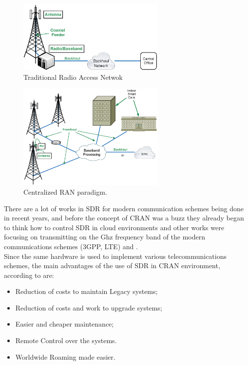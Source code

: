 \begin{figure}[htbp]
    \centering
    \includegraphics[width=0.65\textwidth]{./figures/traditional_bs}
    \caption{ Traditional Radio Access Netwok
    \label{fig:tran}}
\end{figure}

\begin{figure}[htbp]
    \centering
    \includegraphics[width=0.65\textwidth]{./figures/c_RAN}
    \caption{ Centralized RAN paradigm.
    \label{fig:cran}}
\end{figure}

There are a lot of works in SDR for modern communication schemes being done in
recent years, and before the concept of CRAN was a buzz they already began to
think how to control SDR in cloud environments \cite{dayananda2012} and other
works were focusing on transmitting on the Ghz frequency band of the modern
communications schemes (3GPP, LTE) \cite{kelley2009} and \cite{neenu2014}.\\

Since the same hardware is used to implement various telecommunications schemes,
the main advantages of the use of SDR in CRAN environment, according to
\cite{dayananda2012} are:

\begin{itemize}
    \item Reduction of costs to maintain Legacy systems;
    \item Reduction of costs and work to upgrade systems;
    \item Easier and cheaper maintenance;
    \item Remote Control over the systems.
    \item Worldwide Roaming made easier.
\end{itemize}


